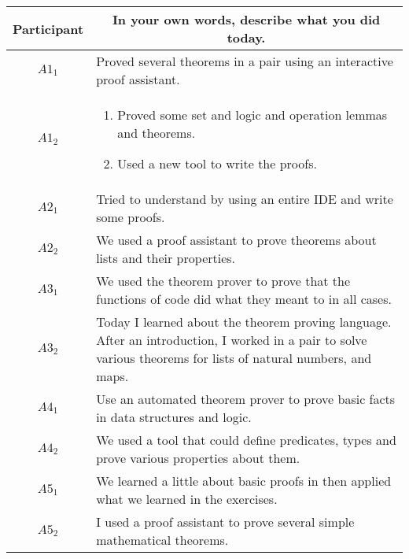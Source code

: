 \noindent
\begin{tabularx}{\linewidth}{@{}cX@{}}
  \toprule
  Participant & \multicolumn{1}{c}{
    \textbf{In your own words, describe what you did today.}
  } \\ \midrule
  $A1_{1}$ & Proved several theorems in a pair using an interactive proof assistant. \\
  $A1_{2}$ & \begin{enumerate} \item Proved some set and logic and operation lemmas and theorems. \item Used a new tool to write the proofs. \end{enumerate} \\
  $A2_{1}$ & Tried to understand \Coq{} by using an entire IDE and write some proofs. \\
  $A2_{2}$ & We used a proof assistant to prove theorems about lists and their properties. \\
  $A3_{1}$ & We used the theorem prover to prove that the functions of code did what they meant to in all cases. \\
  $A3_{2}$ & Today I learned about the \Coq{} theorem proving language.  After an introduction, I worked in a pair to solve various theorems for lists of natural numbers, and maps. \\
  $A4_{1}$ & Use an automated theorem prover to prove basic facts in data structures and logic. \\
  $A4_{2}$ & We used a tool that could define predicates, types and prove various properties about them. \\
  $A5_{1}$ & We learned a little about basic proofs in \Coq{} then applied what we learned in the exercises. \\
  $A5_{2}$ & I used a proof assistant to prove several simple mathematical theorems. \\
  \bottomrule
\end{tabularx}{\parfillskip=0pt\par}

\clearpage


